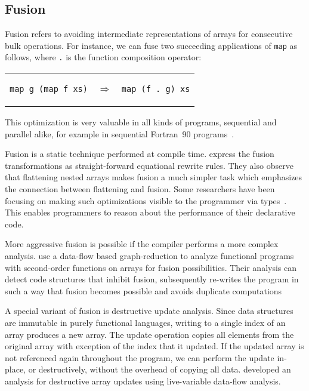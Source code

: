 \documentclass[a4paper]{article}
\begin{document}
\subsection{Fusion}
\label{sec:fusion}

Fusion refers to avoiding intermediate representations of arrays for consecutive bulk operations. For instance, we can fuse two succeeding applications of \texttt{map} as follows, where \texttt{.} is the function composition operator:

\begin{center}
  \begin{tabular}{ccc}
\begin{lstlisting}[language=ML]
map g (map f xs)
\end{lstlisting}
    & $\Longrightarrow$ &
\begin{lstlisting}[language=ML]
map (f . g) xs
\end{lstlisting}
  \end{tabular}
\end{center}

This optimization is very valuable in all kinds of programs, sequential and parallel alike, for example in sequential Fortran~90 programs~\cite{Hwang:1995:AOS:209936.209949}.

Fusion is a static technique performed at compile time. \citet{Chakravarty:2001:FAF:507635.507661} express the fusion transformations as straight-forward equational rewrite rules. They also observe that flattening nested arrays makes fusion a much simpler task which emphasizes the connection between flattening and fusion. Some researchers have been focusing on making such optimizations visible to the programmer via types~\cite{Lippmeier:2012:GPA:2364506.2364511}. This enables programmers to reason about the performance of their declarative code.

More aggressive fusion is possible if the compiler performs a more complex analysis. \citet{Henriksen:2013:TGA:2502323.2502328} use a data-flow based graph-reduction to analyze functional programs with second-order functions on arrays for fusion possibilities. Their analysis can detect code structures that inhibit fusion, subsequently re-writes the program in such a way that fusion becomes possible and avoids duplicate computations

A special variant of fusion is destructive update analysis. Since data structures are immutable in purely functional languages, writing to a single index of an array produces a new array. The update operation copies all elements from the original array with exception of the index that it updated. If the updated array is not referenced again throughout the program, we can perform the update in-place, or destructively, without the overhead of copying all data. \citet{Sastry:1994:PDU:182409.182486} developed an analysis for destructive array updates using live-variable data-flow analysis.
\end{document}
